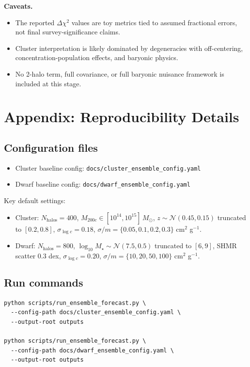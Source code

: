 \documentclass[11pt]{article}
\begin{document}
\textbf{Caveats.}
\begin{itemize}[leftmargin=1.5em]
    \item The reported $\Delta\chi^2$ values are toy metrics tied to assumed fractional errors, not final survey-significance claims.
    \item Cluster interpretation is likely dominated by degeneracies with off-centering, concentration-population effects, and baryonic physics.
    \item No 2-halo term, full covariance, or full baryonic nuisance framework is included at this stage.
\end{itemize}

\appendix
\section{Appendix: Reproducibility Details}

\subsection{Configuration files}
\begin{itemize}[leftmargin=1.5em]
    \item Cluster baseline config: \texttt{docs/cluster\_ensemble\_config.yaml}
    \item Dwarf baseline config: \texttt{docs/dwarf\_ensemble\_config.yaml}
\end{itemize}

Key default settings:
\begin{itemize}[leftmargin=1.5em]
    \item Cluster: $N_{\mathrm{halos}}=400$, $M_{200c}\in[10^{14},10^{15}]\,M_\odot$, $z\sim\mathcal{N}(0.45,0.15)$ truncated to $[0.2,0.8]$, $\sigma_{\log c}=0.18$, $\sigma/m=\{0.05,0.1,0.2,0.3\}$ cm$^2$ g$^{-1}$.
    \item Dwarf: $N_{\mathrm{halos}}=800$, $\log_{10}M_\star\sim\mathcal{N}(7.5,0.5)$ truncated to $[6,9]$, SHMR scatter $0.3$ dex, $\sigma_{\log c}=0.20$, $\sigma/m=\{10,20,50,100\}$ cm$^2$ g$^{-1}$.
\end{itemize}

\subsection{Run commands}
\begin{verbatim}
python scripts/run_ensemble_forecast.py \
  --config-path docs/cluster_ensemble_config.yaml \
  --output-root outputs

python scripts/run_ensemble_forecast.py \
  --config-path docs/dwarf_ensemble_config.yaml \
  --output-root outputs
\end{verbatim}
\end{document}
